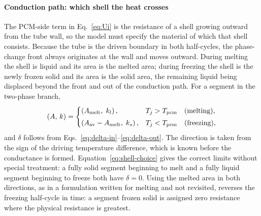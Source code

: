 \paragraph{Conduction path: which shell the heat crosses}
The PCM-side term in Eq.~\eqref{eq:Ui} is the resistance of a shell growing
outward from the tube wall, so the model must specify the material of which
that shell consists. Because the tube is the driven boundary in both
half-cycles, the phase-change front always originates at the wall and moves
outward. During melting the shell is liquid and its area is the melted area;
during freezing the shell is the newly frozen solid and its area is the solid
area, the remaining liquid being displaced beyond the front and out of the
conduction path. For a segment in the two-phase branch,
\begin{equation}
  \left(A,\,k\right)=
  \begin{cases}
    \left(A_{\mathrm{melt}},\;k_{l}\right), & T_j>T_{\mathrm{pcm}}\quad\text{(melting)},\\[3pt]
    \left(A_{\mathrm{av}}-A_{\mathrm{melt}},\;k_{s}\right), & T_j<T_{\mathrm{pcm}}\quad\text{(freezing)},
  \end{cases}
  \label{eq:shell-choice}
\end{equation}
and $\delta$ follows from Eqs.~\eqref{eq:delta-in}--\eqref{eq:delta-out}. The
direction is taken from the sign of the driving temperature difference, which
is known before the conductance is formed. Equation~\eqref{eq:shell-choice}
gives the correct limits without special treatment: a fully solid segment
beginning to melt and a fully liquid segment beginning to freeze both have
$\delta=0$. Using the melted area in both directions, as in a formulation
written for melting and not revisited, reverses the freezing half-cycle in
time: a segment frozen solid is assigned zero resistance where the physical
resistance is greatest.

